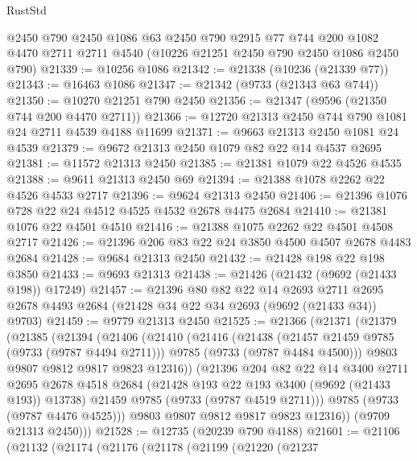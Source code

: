 \begin{lexlean}{RustStd}
\begin{coremodule}
{\begin{coremodule}
{{{{{{{{{{{{{{{{{{{{{{{{{{{{{{{{{{{{{{{{{{{{{{{{{{{{{{{    @2450
    @790
    @2450
    @1086
    @63
    @2450
    @790
    @2915
    @77
    @744
    @200
    @1082
    @4470
    @2711
    @2711
    @4540
    (@10226 @21251 @2450 @790 @2450 @1086 @2450 @790)
@21339 := @10256 @1086
@21342 := @21338 (@10236 (@21339 @77))
@21343 := @16463 @1086
@21347 := @21342 (@9733 (@21343 @63 @744))
@21350 := @10270 @21251 @790 @2450
@21356 := @21347 (@9596 (@21350 @744 @200 @4470 @2711))
@21366 := @12720 @21313 @2450 @744 @790 @1081 @24 @2711 @4539 @4188 @11699
@21371 := @9663 @21313 @2450 @1081 @24 @4539
@21379 := @9672 @21313 @2450 @1079 @82 @22 @14 @4537 @2695
@21381 := @11572 @21313 @2450
@21385 := @21381 @1079 @22 @4526 @4535
@21388 := @9611 @21313 @2450 @69
@21394 := @21388 @1078 @2262 @22 @4526 @4533 @2717
@21396 := @9624 @21313 @2450
@21406 := @21396 @1076 @728 @22 @24 @4512 @4525 @4532 @2678 @4475 @2684
@21410 := @21381 @1076 @22 @4501 @4510
@21416 := @21388 @1075 @2262 @22 @4501 @4508 @2717
@21426 := @21396 @206 @83 @22 @24 @3850 @4500 @4507 @2678 @4483 @2684
@21428 := @9684 @21313 @2450
@21432 := @21428 @198 @22 @198 @3850
@21433 := @9693 @21313
@21438 := @21426 (@21432 (@9692 (@21433 @198)) @17249)
@21457 := @21396
    @80
    @82
    @22
    @14
    @2693
    @2711
    @2695
    @2678
    @4493
    @2684
    (@21428 @34 @22 @34 @2693 (@9692 (@21433 @34)) @9703)
@21459 := @9779 @21313 @2450
@21525 := @21366
    (@21371
      (@21379
        (@21385
          (@21394
            (@21406
              (@21410
                (@21416
                  (@21438
                    (@21457 @21459 @9785 (@9733 (@9787 @4494 @2711)))
                    @9785
                    (@9733 (@9787 @4484 @4500)))
                  @9803
                  @9807
                  @9812
                  @9817
                  @9823
                  @12316))
              (@21396
                @204
                @82
                @22
                @14
                @3400
                @2711
                @2695
                @2678
                @4518
                @2684
                (@21428 @193 @22 @193 @3400 (@9692 (@21433 @193)) @13738)
                @21459
                @9785
                (@9733 (@9787 @4519 @2711)))
              @9785
              (@9733 (@9787 @4476 @4525)))
            @9803
            @9807
            @9812
            @9817
            @9823
            @12316))
        (@9709 @21313 @2450)))
@21528 := @12735 (@20239 @790 @4188)
@21601 := @21106
    (@21132
      (@21174
        (@21176
          (@21178
            (@21199
              (@21220
                (@21237
}}}}}}}}}}}}}}}}}}}}}}}}}}}}}}}}}}}}}}}}}}}}}}}}}}}}}}}
\end{coremodule}}
\end{coremodule}
\end{lexlean}
